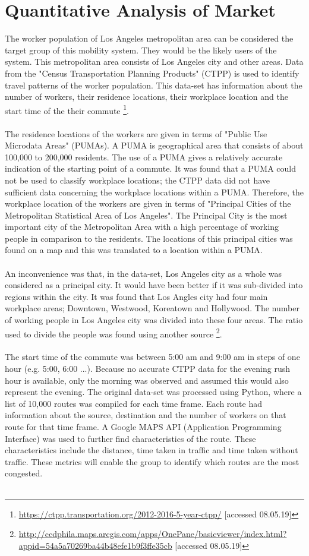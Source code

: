 \section{Quantitative Analysis of Market}
\label{quantmarket}
The worker population of Los Angeles metropolitan area can be considered the target group of this mobility system. They would be the likely users of the system. This metropolitan area consists of Los Angeles city and other areas.
Data from the "Census Transportation Planning Products" (CTPP) is used to identify travel patterns of the worker population. This data-set has information about the number of workers, their residence locations, their workplace location and the start time of the their commute \footnote{\url{https://ctpp.transportation.org/2012-2016-5-year-ctpp/} [accessed 08.05.19]}.\\\\
The residence locations of the workers are given in terms of "Public Use Microdata Areas" (PUMAs). A PUMA is geographical area that consists of about 100,000 to 200,000 residents. The use of a PUMA gives a relatively accurate indication of the starting point of a commute. It was found that a PUMA could not be used to classify workplace locations; the CTPP data did not have sufficient data concerning the workplace locations within a PUMA. Therefore, the workplace location of the workers are given in terms of "Principal Cities of the Metropolitan Statistical Area of Los Angeles". The Principal City is the most important city of the Metropolitan Area with a high percentage of working people in comparison to the residents. The locations of this principal cities was found on a map and this was translated to a location within a PUMA.\\\\
An inconvenience was that, in the data-set, Los Angeles city as a whole was considered as a principal city. It would have been better if it was sub-divided into regions within the city. It was found that Los Angles city had four main workplace areas; Downtown, Westwood, Koreatown and Hollywood. The number of working people in Los Angeles city was divided into these four areas. The ratio used to divide the people was found using another source \footnote{\url{http://ccdphila.maps.arcgis.com/apps/OnePane/basicviewer/index.html?appid=54a5a70269ba44b48efe1b9f3ffe35cb} [accessed 08.05.19]}. \\\\
The start time of the commute was between 5:00 am and 9:00 am in steps of one hour (e.g. 5:00, 6:00 ...). Because no accurate CTPP data for the evening rush hour is available, only the morning was observed and assumed this would also represent the evening. The original data-set was processed using Python, where a list of 10,000 routes was compiled for each time frame. Each route had information about the source, destination and the number of workers on that route for that time frame. A Google MAPS API (Application Programming Interface) was used to further find characteristics of the route. These characteristics include the distance, time taken in traffic and time taken without traffic. These metrics will enable the group to identify which routes are the most congested. \\\\
